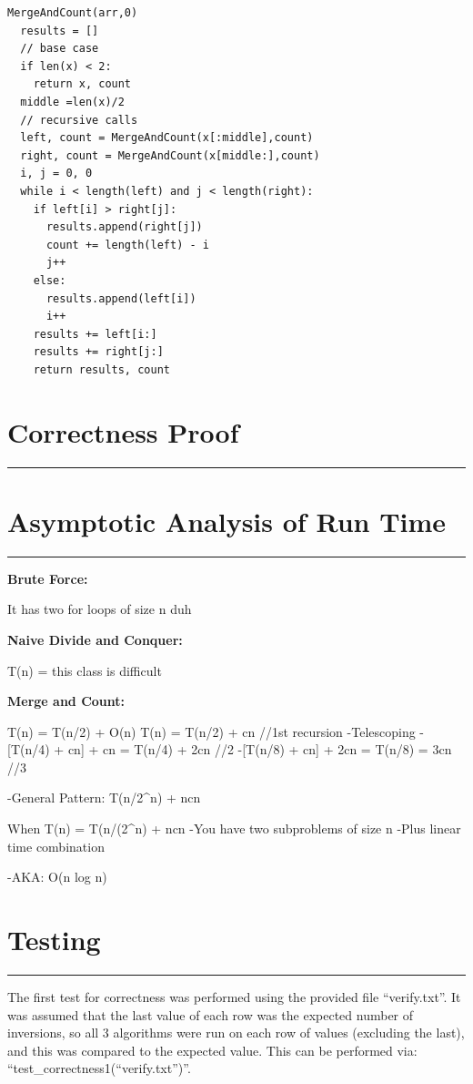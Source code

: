 \documentclass[letterpaper,10pt,titlepage,fleqn]{article}
\begin{document}
\begin{lstlisting}
MergeAndCount(arr,0)
  results = []
  // base case
  if len(x) < 2:
    return x, count
  middle =len(x)/2
  // recursive calls
  left, count = MergeAndCount(x[:middle],count)
  right, count = MergeAndCount(x[middle:],count)
  i, j = 0, 0
  while i < length(left) and j < length(right):
    if left[i] > right[j]:
      results.append(right[j])
      count += length(left) - i
      j++
    else:
      results.append(left[i])
      i++
    results += left[i:]
    results += right[j:]
    return results, count
\end{lstlisting}

\section*{Correctness Proof}
\hrule

\section*{Asymptotic Analysis of Run Time}
\hrule
\begin{centering}
\textbf{Brute Force:}
\end{centering}
It has two for loops of size n duh

\begin{centering}
\textbf{Naive Divide and Conquer:}
\end{centering}
T(n) = this class is difficult

\begin{centering}
\textbf{Merge and Count:}
\end{centering}
T(n) = T(n/2) + O(n) 
T(n) = T(n/2) + cn //1st recursion
    -Telescoping
        -[T(n/4) + cn] + cn = T(n/4) + 2cn //2
          -[T(n/8) + cn] + 2cn = T(n/8) = 3cn //3

    -General Pattern: T(n/2^n) + ncn

    When T(n) = T(n/(2^n) + ncn
        -You have two subproblems of size n
        -Plus linear time combination

        -AKA: O(n log n)


\section*{Testing}
\hrule
The first test for correctness was performed using the provided file ``verify.txt''. It was assumed that the last value of each row was the expected number of inversions, so all 3 algorithms were run on each row of values (excluding the last), and this was compared to the expected value. This can be performed via: ``test\_correctness1(``verify.txt'')''.
\end{document}
